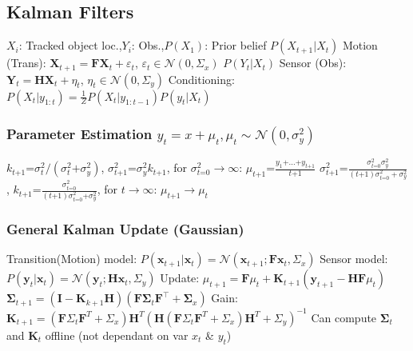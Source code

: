 \documentclass[a4paper, 11pt, landscape]{article}
\begin{document}
\begin{multicols*}{3}
\subsection{Kalman Filters}
$X_i$: Tracked object loc.,\space\space\space\space $Y_i$: Obs.,\space\space\space\space $P(X_1)$: Prior belief
\newline $P(X_{t+1} | X_t)$ Motion (Trans): $\mathbf{X}_{t+1}=\mathbf{F} \mathbf{X}_{t}+\varepsilon_{t}$, $\varepsilon_{t} \in \mathcal{N}\left(0, \Sigma_{x}\right)$
\newline $P(Y_{t} | X_t)$ Sensor (Obs): $\mathbf{Y}_{t}=\mathbf{H X}_{t}+\eta_{t}$, $\eta_{t} \in \mathcal{N}\left(0, \Sigma_{y}\right)$
\newline Conditioning: $P(X_t|y_{1:t}) = \frac{1}{Z} P(X_{t} | y_{1:t-1})P(y_{t} | X_t)$

\subsubsection{Parameter Estimation $y_t = x + \mu_t, \mu_t\sim\mathcal{N}(0,\sigma_y^2)$}
$k_{t\text{+}1} \text{=} \sigma_t^2/(\sigma_t^2\text{+}\sigma_y^2)$, $\sigma_{t\text{+}1}^2\text{=}\sigma_y^2k_{t\text{+}1}$, 
for $\sigma_{t\text{=}0}^2\to\infty$: $\mu_{t\text{+}1}\text{=}\frac{y_1\text{+}...\text{+}y_{t\text{+}1}}{t\text{+}1}$
\newline $\sigma_{t\text{+}1}^2\text{=}\frac{\sigma_{t\text{=}0}^2\sigma_{y}^2}{(t\text{+}1)\sigma_{t\text{=}0}^2+\sigma_{y}^2}$, 
$k_{t\text{+}1}\text{=}\frac{\sigma_{t\text{=}0}^2}{(t\text{+}1)\sigma_{t\text{=}0}^2\text{+}\sigma_{y}^2}$, 
for $t \to \infty$: $\mu_{t\text{+}1}\to\mu_t$

\subsubsection{General Kalman Update (Gaussian)}
Transition(Motion) model: $ P\left(\mathbf{x}_{t+1} | \mathbf{x}_{t}\right) =\mathcal{N}\left(\mathbf{x}_{t+1} ; \mathbf{F} \mathbf{x}_{t}, \Sigma_{x}\right) $
\newline Sensor model: $ P\left(\mathbf{y}_{t} | \mathbf{x}_{t}\right) =\mathcal{N}\left(\mathbf{y}_{t} ; \mathbf{H} \mathbf{x}_{t}, \Sigma_{y}\right)$
\newline Update: $\mu_{t+1}=\mathbf{F} \mu_{t}+\mathbf{K}_{t+1}\left(\mathbf{y}_{t+1}-\mathbf{H} \mathbf{F} \mu_{t}\right)$
\newline $\boldsymbol{\Sigma}_{t+1}=\left(\mathbf{I}-\mathbf{K}_{k+1} \mathbf{H}\right)\left(\mathbf{F} \boldsymbol{\Sigma}_{t} \mathbf{F}^{\top}+\boldsymbol{\Sigma}_{x}\right)$
\newline Gain: $\mathbf{K}_{t+1}=\left(\mathbf{F} \Sigma_{t} \mathbf{F}^{T}+\Sigma_{x}\right) \mathbf{H}^{T}\left(\mathbf{H}\left(\mathbf{F} \Sigma_{t} \mathbf{F}^{T}+\Sigma_{x}\right) \mathbf{H}^{T}+\Sigma_{y}\right)^{-1}$
\newline Can compute $\boldsymbol{\Sigma}_{t}$ and $\mathbf{K}_{t}$ offline (not dependant on var $x_t$ \& $y_t$)


\end{multicols*}
\end{document}
